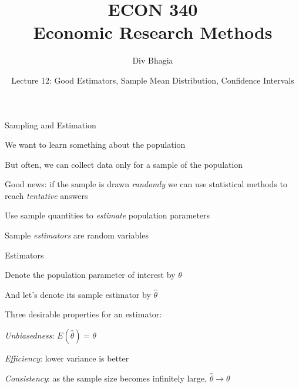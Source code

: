 \documentclass{./../div_teaching_slides}
\begin{document}
\title{ECON 340 \\ Economic Research Methods}
\author{Div Bhagia}
\date{Lecture 12: Good Estimators, Sample Mean Distribution, Confidence Intervals}

\begin{frame}
\maketitle
\end{frame}

\begin{frame}{Sampling and Estimation}
\begin{witemize}
\item We want to learn something about the population
\item But often, we can collect data only for a sample of the population
\item Good news: if the sample is drawn \textit{randomly} we can use statistical methods to reach \textit{tentative} answers 
\item Use sample quantities to \textit{estimate} population parameters
\item Sample \textit{estimators} are random variables
\end{witemize}
\end{frame}

\begin{frame}{Estimators}
\begin{witemize}
  \item Denote the population parameter of interest by $\theta$
  \item And let's denote its sample estimator by $\hat{\theta}$
  \item Three desirable properties for an estimator: \\
  \begin{witemize}
  \normalsize
  \item \textit{Unbiasedness}: $ E(\hat{\theta}) = \theta $
  \item \textit{Efficiency}: lower variance is better
  \item \textit{Consistency}: as the sample size becomes infinitely large,  $\hat{\theta} \rightarrow \theta$
\end{witemize}
\end{witemize}
\end{frame}
\end{document}
